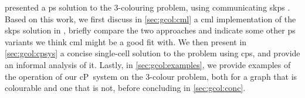 
% 
% 
% 




\citeauthor{Gheorghe2013} presented a \gls{ps} solution to the 3-colouring problem, using communicating \gls{skps} \cite{Gheorghe2013}.  Based on this work, we first discuss in \autoref{sec:gcol:cml} a \gls{cml} implementation of the \gls{skps} solution in \cite{Gheorghe2013}, briefly compare the two approaches and indicate some other \gls{ps} variants we think \gls{cml} might be a good fit with.  We then present in \autoref{sec:gcol:cpsys} a concise single-cell solution to the problem using \gls{cps}, and provide an informal analysis of it.  Lastly, in \autoref{sec:gcol:examples}, we provide examples of the operation of our cP~system on the 3-colour problem, both for a graph that is colourable and one that is not, before concluding in \autoref{sec:gcol:conc}.

